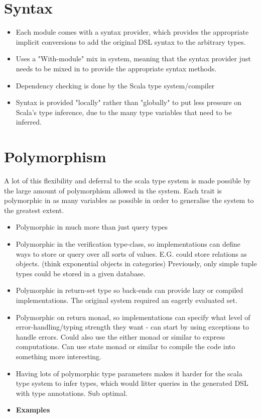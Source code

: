 \documentclass{report}
\newcommand \2[0]{\textbf{2}}
\newcommand \3[0]{\textbf{3}}
\newcommand{\todo}[1]{\textbf{#1}}
\begin{document}
\section{Syntax}
\begin{itemize}
    \item Each module comes with a syntax provider, which provides the appropriate implicit conversions to add the original DSL syntax to the arbitrary types.
    \item Uses a "With-module" mix in system, meaning that the syntax provider just needs to be mixed in to provide the appropriate syntax methods.
    \item Dependency checking is done by the Scala type system/compiler
    \item Syntax is provided "locally" rather than "globally" to put less pressure on Scala's type inference, due to the many type variables that need to be inferred.
\end{itemize}

\section{Polymorphism}
A lot of this flexibility and deferral to the scala type system is made possible by the large amount of polymorphism allowed in the system. Each trait is polymorphic in as many variables as possible in order to generalise the system to the greatest extent.
\begin{itemize}
    \item Polymorphic in much more than just query types
    \item Polymorphic in the verification type-class, so implementations can define ways to store or query over all sorts of values. E.G. could store relations as objects. (think exponential objects in categories) Previously, only simple tuple types could be stored in a given database.
    \item Polymorphic in return-set type so back-ends can provide lazy or compiled implementations. The original system required an eagerly evaluated set.
    \item Polymorphic on return monad, so implementations can specify what level of error-handling/typing strength they want - can start by using exceptions to handle errors. Could also use the either monad or similar to express computations. Can use state monad or similar to compile the code into something more interesting.
    \item Having lots of polymorphic type parameters makes it harder for the scala type system to infer types, which would litter queries in the generated DSL with type annotations. Sub optimal.
    \item\todo{Examples}
\end{itemize}
\end{document}
